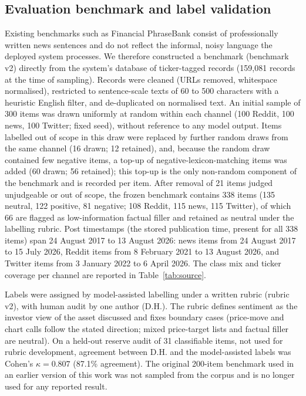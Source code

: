\documentclass{aims}
\numberwithin{equation}{section}
\begin{document}
\subsection{Evaluation benchmark and label validation}\label{sec:benchmark}
Existing benchmarks such as Financial PhraseBank \citep{malo2014} consist of
professionally written news sentences and do not reflect the informal, noisy
language the deployed system processes. We therefore constructed a benchmark
(benchmark v2) directly from the system's database of ticker-tagged records
(159{,}081 records at the time of sampling). Records were cleaned (URLs removed,
whitespace normalised), restricted to sentence-scale texts of 60 to 500 characters
with a heuristic English filter, and de-duplicated on normalised text. An initial
sample of 300 items was drawn uniformly at random within each channel (100 Reddit,
100 news, 100 Twitter; fixed seed), without reference to any model output.
Items labelled out of scope in this draw were replaced by further random draws
from the same channel (16 drawn; 12 retained), and, because the random draw contained few negative items, a top-up of
negative-lexicon-matching items was added (60 drawn; 56 retained); this top-up is
the only non-random component of the benchmark and is recorded per item. After
removal of 21 items judged unjudgeable or out of scope, the frozen benchmark
contains 338 items (135 neutral, 122 positive, 81 negative; 108 Reddit, 115 news,
115 Twitter), of which 66 are flagged as low-information factual filler and retained
as neutral under the labelling rubric.
Post timestamps (the stored publication time, present for all 338 items) span
24 August 2017 to 13 August 2026: news items from 24 August 2017 to 15 July 2026,
Reddit items from 8 February 2021 to 13 August 2026, and Twitter items from 3 January
2022 to 6 April 2026. The class mix and ticker coverage per channel are reported in
Table~\ref{tab:source}.

Labels were assigned by model-assisted labelling under a written rubric (rubric
v2), with human audit by one author (D.H.). The rubric defines sentiment as the
investor view of the asset discussed and fixes boundary cases (price-move and chart
calls follow the stated direction; mixed price-target lists and factual filler are
neutral). On a held-out reserve audit of 31 classifiable items, not used for rubric
development, agreement between D.H. and the model-assisted labels was Cohen's
$\kappa = 0.807$ \citep{cohen1960} (87.1\% agreement). The original 200-item benchmark used in an earlier version of
this work was not sampled from the corpus and is no longer used for any reported
result.
\end{document}
